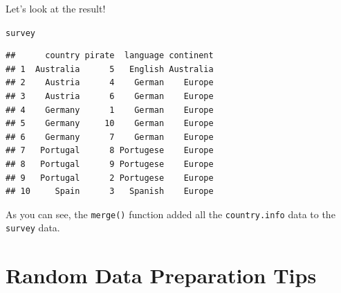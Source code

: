 \documentclass{tufte-book}\usepackage[]{graphicx}\usepackage[]{color}
\makeatletter
\newcommand{\hlstd}[1]{\textcolor[rgb]{0.345,0.345,0.345}{#1}}%
\newenvironment{kframe}{%
 \def\at@end@of@kframe{}%
 \ifinner\ifhmode%
  \def\at@end@of@kframe{\end{minipage}}%
  \begin{minipage}{\columnwidth}%
 \fi\fi%
 \def\FrameCommand##1{\hskip\@totalleftmargin \hskip-\fboxsep
 \colorbox{shadecolor}{##1}\hskip-\fboxsep
     \hskip-\linewidth \hskip-\@totalleftmargin \hskip\columnwidth}%
 \MakeFramed {\advance\hsize-\width
   \@totalleftmargin\z@ \linewidth\hsize
   \@setminipage}}%
 {\par\unskip\endMakeFramed%
 \at@end@of@kframe}
\newenvironment{knitrout}{}{} %
\makeatother
\begin{document}
Let's look at the result!

\begin{footnotesize}
\begin{knitrout}
\color{fgcolor}\begin{kframe}
\begin{alltt}
\hlstd{survey}
\end{alltt}
\begin{verbatim}
##      country pirate  language continent
## 1  Australia      5   English Australia
## 2    Austria      4    German    Europe
## 3    Austria      6    German    Europe
## 4    Germany      1    German    Europe
## 5    Germany     10    German    Europe
## 6    Germany      7    German    Europe
## 7   Portugal      8 Portugese    Europe
## 8   Portugal      9 Portugese    Europe
## 9   Portugal      2 Portugese    Europe
## 10     Spain      3   Spanish    Europe
\end{verbatim}
\end{kframe}
\end{knitrout}
\end{footnotesize}

As you can see, the \texttt{merge()} function added all the \texttt{country.info} data to the \texttt{survey} data.


\section{Random Data Preparation Tips}
\end{document}
